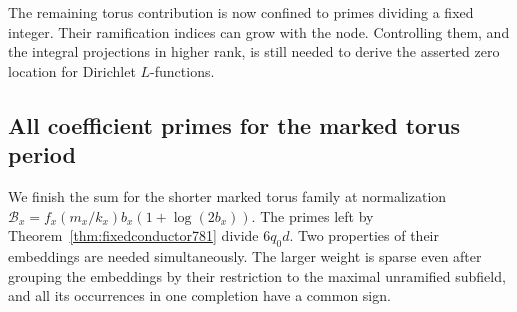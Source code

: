 \documentclass[a4paper,11pt]{article}
\theoremstyle{definition}
\theoremstyle{remark}
\numberwithin{equation}{section}
\begin{document}
The remaining torus contribution is now confined to
primes dividing a fixed integer. Their ramification
indices can grow with the node. Controlling them, and
the integral projections in higher rank, is still needed
to derive the asserted zero location for Dirichlet
\(L\)-functions.
\clearpage

\subsection{All coefficient primes for the marked torus period}
\label{sec:alltorus783}
We finish the sum for the shorter marked torus family
at normalization \(\mathcal B_x=f_x(m_x/k_x)b_x(1+\log(2b_x))\).
The primes left by Theorem~\ref{thm:fixedconductor781}
divide \(6q_0d\). Two properties of their embeddings are
needed simultaneously. The larger weight is sparse even
after grouping the embeddings by their restriction to the
maximal unramified subfield, and all its occurrences in
one completion have a common sign.
\end{document}
